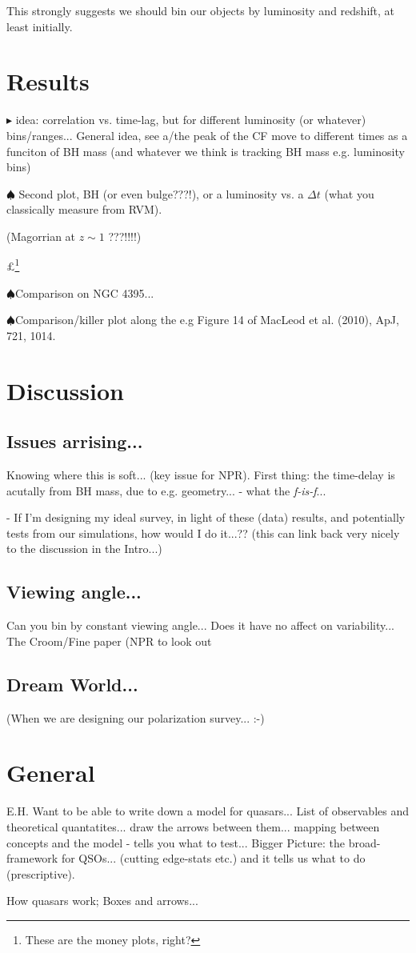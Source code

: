 \documentclass[11pt,a4paper]{article}
\begin{document}
    This strongly suggests we should bin our objects by luminosity and
    redshift, at least initially.

      
\section{Results}
     
$\blacktriangleright$ idea: correlation vs. time-lag, but for
different luminosity (or whatever) bins/ranges... General idea, see
a/the peak of the CF move to different times as a funciton of BH mass
(and whatever we think is tracking BH mass e.g. luminosity bins)

$\spadesuit$
Second plot, BH (or even bulge???!), or a luminosity vs. a $\Delta t$ (what you
classically measure from RVM). 

(Magorrian at $z\sim1$ ???!!!!) 

$\pounds$\footnote{These are the money plots, right?}

$\spadesuit$Comparison on
NGC 4395...

$\spadesuit$Comparison/killer plot along the 
e.g Figure 14 of MacLeod et al. (2010), ApJ, 721, 1014.


\section{Discussion}

    \subsection{Issues arrising...}
    Knowing where this is soft... 
    (key issue for NPR). 
    First thing: the time-delay is acutally from BH mass, due to e.g. geometry...
    - what the {\it f-is-f}...

    - If I'm designing my ideal survey, in light of these (data)
    results, and potentially tests from our simulations, how would I do
    it...??  (this can link back very nicely to the discussion in the
    Intro...)
    
    \subsection{Viewing angle...}
    Can you bin by constant viewing angle...
    Does it have no affect on variability...
    The Croom/Fine paper (NPR to look out 

    \subsection{Dream World...}
    (When we are designing our polarization survey... :-) 


\section{General}
E.H. Want to be able to write down a model for quasars...
List of observables and theoretical quantatites...
draw the arrows between them...
mapping between concepts and the model - tells you what
 to test...
Bigger Picture: the broad-framework for QSOs...
(cutting edge-stats etc.) and it tells us what to do
(prescriptive). 

How quasars work; Boxes and arrows...
\end{document}
